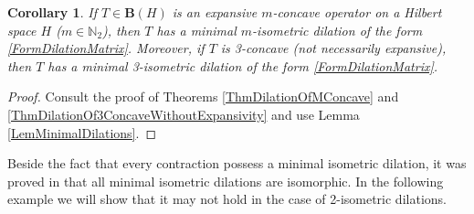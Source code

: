 \documentclass{amsart}
\newtheorem{corollary}[theorem]{Corollary}
\theoremstyle{definition}
\numberwithin{equation}{section}
\begin{document}
\begin{corollary}
    \label{CorMinimalDilations}
    If $ T\in \mathbf{B}(H) $ is an expansive $ m $-concave operator on a Hilbert space $ H $ ($ m\in \mathbb{N}_{2} $), then $ T $ has a minimal $ m $-isometric dilation of the form \eqref{FormDilationMatrix}. Moreover, if $ T $ is 3-concave (not necessarily expansive), then $ T $ has a minimal 3-isometric dilation of the form \eqref{FormDilationMatrix}.
\end{corollary}
\begin{proof}
    Consult the proof of Theorems \ref{ThmDilationOfMConcave} and \ref{ThmDilationOf3ConcaveWithoutExpansivity} and use Lemma \ref{LemMinimalDilations}.
\end{proof}
Beside the fact that every contraction possess a minimal isometric dilation, it was proved in \cite[Chapter I, Theorem 4.1]{SzNagyHarmonicAnalysisOfOperators} that all minimal isometric dilations are isomorphic. In the following example we will show that it may not hold in the case of 2-isometric dilations.
\end{document}
